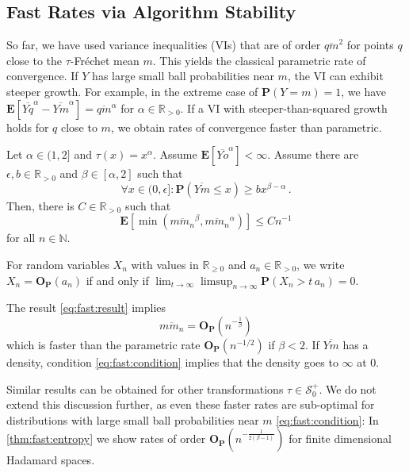 \documentclass{article}
\newcommand*{\mc}[1]{\mathcal{#1}}
\newcommand{\N}{\mathbb{N}}
\newcommand{\R}{\mathbb{R}}
\newcommand{\Rp}{\R_{\geq0}}
\newcommand{\Rpp}{\R_{>0}}
\newcommand{\lab}{\left[} %
\newcommand{\rab}{\right]} %
\newcommand{\ab}[1]{\lab #1 \rab} %
\newcommand{\abOf}[1]{\!\ab{#1}} %
\newcommand{\lb}{\left(} %
\newcommand{\rb}{\right)} %
\newcommand{\br}[1]{\lb #1 \rb} %
\newcommand{\brOf}[1]{\!\br{#1}} %
\renewcommand{\Pr}{\mathbf{P}} %
\newcommand{\Prof}[1]{\Pr(#1)}
\newcommand{\PrOf}[1]{\Pr\brOf{#1}}
\newcommand{\E}{\mathbf{E}} %
\newcommand{\Eof}[1]{\E[#1]}
\newcommand{\EOf}[1]{\E\abOf{#1}}
\newcommand{\eqfs}{\,.}
\newcommand{\ol}[2]{\overline{#1#2}}
\newcommand{\tran}{\tau}
\newcommand{\setcciz}{\mc S_0^+}
\newcommand{\Op}{\mathbf{O}_{\Pr}}
\begin{document}
\subsection{Fast Rates via Algorithm Stability}\label{ssec:fast}
%
So far, we have used variance inequalities (VIs) that are of order $\ol qm^2$ for points $q$ close to the $\tran$-Fr\'echet mean $m$. This yields the classical parametric rate of convergence. If $Y$ has large small ball probabilities near $m$, the VI can exhibit steeper growth. For example, in the extreme case of $\Prof{Y=m} = 1$, we have $\Eof{\ol Yq^\alpha - \ol Ym^\alpha} = \ol qm^\alpha$ for $\alpha \in \Rpp$. If a VI with steeper-than-squared growth holds for $q$ close to $m$, we obtain rates of convergence faster than parametric.

\begin{theorem}\label{thm:fast}
    Let $\alpha \in (1,2]$ and $\tran(x)=x^\alpha$.
    Assume $\Eof{\ol{Y}o^\alpha}<\infty$.
    Assume there are $\epsilon,b\in\Rpp$ and $\beta \in [\alpha, 2]$ such that 
    \begin{equation}\label{eq:fast:condition}
        \forall x\in (0,\epsilon]\colon \PrOf{\ol Ym \leq x} \geq b x^{\beta-\alpha}
        \eqfs
    \end{equation}
    Then, there is $C \in \Rpp$ such that 
    \begin{equation}\label{eq:fast:result}
        \EOf{\min\brOf{\ol m{m_n}^\beta, \ol m{m_n}^{\alpha}}}
        \leq
        C n^{-1}
    \end{equation}
    for all $n\in\N$.
\end{theorem}
%
For random variables $X_n$ with values in $\Rp$ and $a_n\in\Rpp$, we write
$X_n = \Op(a_n)$ if and only if
$\lim_{t\to\infty}\limsup_{n\to\infty}\Prof{X_n > t\, a_n} = 0$.
%
\begin{remark}
	The result \eqref{eq:fast:result} implies
	\begin{equation}
		\ol m{m_n} = \Op\brOf{n^{-\frac1\beta}}
	\end{equation}
	which is faster than the parametric rate $\Op(n^{-1/2})$ if $\beta < 2$. If $\ol Ym$ has a density, condition \eqref{eq:fast:condition} implies that the density goes to $\infty$ at $0$.
\end{remark}
%
Similar results can be obtained for other transformations $\tran\in\setcciz$. We do not extend this discussion further, as even these faster rates are sub-optimal for distributions with large small ball probabilities near $m$ \eqref{eq:fast:condition}: In \cref{thm:fast:entropy} we show rates of order $\Op(n^{-\frac1{2(\beta-1)}})$ for finite dimensional Hadamard spaces. 
\end{document}
